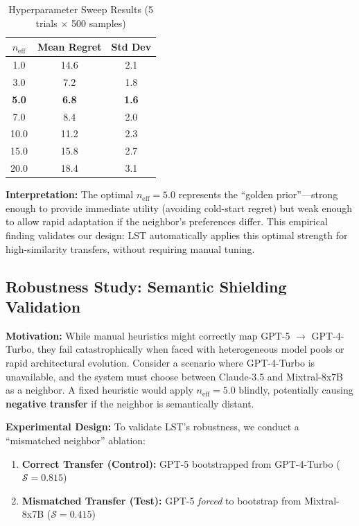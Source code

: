 \documentclass[sigconf,nonacm]{acmart}
\begin{document}
\begin{table}[h]
\centering
\caption{Hyperparameter Sweep Results (5 trials $\times$ 500 samples)}
\label{tab:sweep}
\begin{tabular}{ccc}
\toprule
\textbf{$n_{\text{eff}}$} & \textbf{Mean Regret} & \textbf{Std Dev} \\
\midrule
1.0 & 14.6 & 2.1 \\
3.0 & 7.2 & 1.8 \\
\textbf{5.0} & \textbf{6.8} & \textbf{1.6} \\
7.0 & 8.4 & 2.0 \\
10.0 & 11.2 & 2.3 \\
15.0 & 15.8 & 2.7 \\
20.0 & 18.4 & 3.1 \\
\bottomrule
\end{tabular}
\end{table}

\textbf{Interpretation:} The optimal $n_{\text{eff}} = 5.0$ represents the ``golden prior''—strong enough to provide immediate utility (avoiding cold-start regret) but weak enough to allow rapid adaptation if the neighbor's preferences differ. This empirical finding validates our design: LST automatically applies this optimal strength for high-similarity transfers, without requiring manual tuning.

\subsection{Robustness Study: Semantic Shielding Validation}

\textbf{Motivation:} While manual heuristics might correctly map GPT-5 $\rightarrow$ GPT-4-Turbo, they fail catastrophically when faced with heterogeneous model pools or rapid architectural evolution. Consider a scenario where GPT-4-Turbo is unavailable, and the system must choose between Claude-3.5 and Mixtral-8x7B as a neighbor. A fixed heuristic would apply $n_{\text{eff}} = 5.0$ blindly, potentially causing \textbf{negative transfer} if the neighbor is semantically distant.

\textbf{Experimental Design:} To validate LST's robustness, we conduct a ``mismatched neighbor'' ablation:
\begin{enumerate}
    \item \textbf{Correct Transfer (Control):} GPT-5 bootstrapped from GPT-4-Turbo ($\mathcal{S} = 0.815$)
    \item \textbf{Mismatched Transfer (Test):} GPT-5 \textit{forced} to bootstrap from Mixtral-8x7B ($\mathcal{S} = 0.415$)
\end{enumerate}
\end{document}
